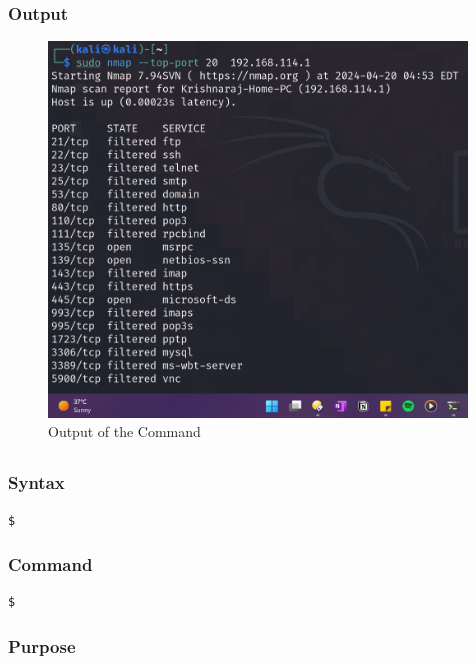 \documentclass[11pt]{article}
\begin{document}
\subsubsection*{Output}
\begin{figure}[H]
    \centering
    \includegraphics[width=0.99\textwidth]{a3_ss (7).png}
    \caption{Output of the Command}
\end{figure}
\subsection{}

\subsubsection*{Syntax}
\begin{verbatim}
$
\end{verbatim}

\subsubsection*{Command}
\begin{verbatim}
$
\end{verbatim}

\subsubsection*{Purpose}
\end{document}

